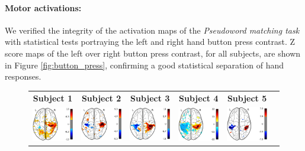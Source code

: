\paragraph{Motor activations:}
We verified the integrity of the activation maps of the \emph{Pseudoword matching task} with statistical tests portraying the left and right hand button press contrast.
Z score maps of the left over right button press contrast, for all subjects, are shown in Figure \ref{fig:button_press}, confirming a good statistical separation of hand responses.

\begin{figure}[ht]
\scriptsize
\hspace{-4ex}
\begin{tabular}{cccccl}
\textbf{\Large Subject 1} & \textbf{\Large Subject 2} & \textbf{\Large Subject 3} & \textbf{\Large Subject 4} & \textbf{\Large Subject 5} & {}\\
{\includegraphics[width=.14\linewidth]{figures/part_II/press_vis_01.pdf}}
\hspace{1ex}
&{\includegraphics[width=.14\linewidth]{figures/part_II/press_vis_03.pdf}}
\hspace{1ex}
&{\includegraphics[width=.14\linewidth]{figures/part_II/press_vis_04.pdf}}
\hspace{1ex}
&{\includegraphics[width=.14\linewidth]{figures/part_II/press_vis_05.pdf}}
\hspace{1ex}
&{\includegraphics[width=.14\linewidth]{figures/part_II/press_vis_06.pdf}}

\end{tabular}
\end{figure}

